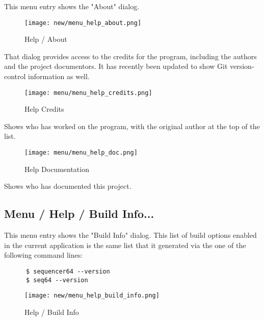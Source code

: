    This menu entry shows the "About" dialog.

\begin{figure}[H]
   \centering 
   \texttt{[image: new/menu\_help\_about.png]}
   \caption{Help / About}
   \label{fig:seq64_menu_help_about}
\end{figure}

   That dialog provides access to the credits for the program, including the
   authors and the project documentors.  It has recently been updated
   to show Git version-control information as well.

\begin{figure}[H]
   \centering 
   \texttt{[image: menu/menu\_help\_credits.png]}
   \caption{Help Credits}
   \label{fig:seq64_menu_help_credits}
\end{figure}

   Shows who has worked on the program, with the original author at the top
   of the list.

\begin{figure}[H]
   \centering 
   \texttt{[image: menu/menu\_help\_doc.png]}
   \caption{Help Documentation}
   \label{fig:seq64_menu_help_doc}
\end{figure}

   Shows who has documented this project.

\subsection{Menu / Help / Build Info...}
\label{subsec:seq64_menu_build_info}

   This menu entry shows the "Build Info" dialog.  This list of
   build options enabled in the current application is the same list
   that it generated via the one of the following command lines:

   \begin{verbatim}
      $ sequencer64 --version
      $ seq64 --version
   \end{verbatim}

\begin{figure}[H]
   \centering 
   \texttt{[image: new/menu\_help\_build\_info.png]}
   \caption{Help / Build Info}
   \label{fig:seq64_menu_help_build_info}
\end{figure}

